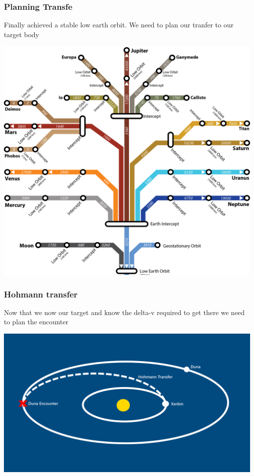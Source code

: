 \begin{frame}
    \frametitle{Planning Transfe}
    \begin{block}{}
        Finally achieved a stable low earth orbit. We need to plan our tranfer to our target body
    \end{block}
\end{frame}
\begin{frame}
    \begin{center}
        \includegraphics[height=\textheight]{images/deltavmap.png}
    \end{center}
\end{frame}
\begin{frame}
    \frametitle{Hohmann transfer}
    \begin{block}{}
        Now that we now our target and know the delta-v required to get there we need to plan the encounter
    \end{block}
    \begin{block}{}
        \begin{center}
            \includegraphics[scale=0.2]{images/hohmann_transfer}
        \end{center}
    \end{block}
\end{frame}
